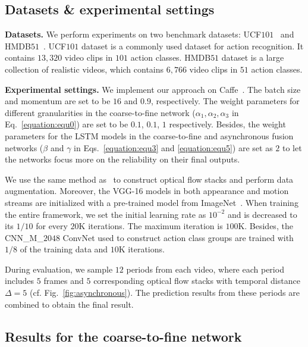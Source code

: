 \documentclass[letterpaper]{article}
\begin{document}
\subsection{Datasets \& experimental settings}\label{Datasets_experimental settings}

{\bf Datasets.} We perform experiments on two benchmark datasets: UCF$101$~\cite{ucf101} and HMDB$51$~\cite{hmdb51}. UCF$101$ dataset is a commonly used dataset for action recognition. It contains $13,320$ video clips in $101$ action classes. HMDB$51$ dataset is a large collection of realistic videos, which contains $6,766$ video clips in $51$ action classes.


{\bf Experimental settings.} We implement our approach on Caffe~\cite{caffe}. The batch size and momentum are set to be $16$ and $0.9$, respectively. The weight parameters for different granularities in the coarse-to-fine network ($\alpha_1,\alpha_2,\alpha_3$ in Eq.~\ref{equation:equ0}) are set to be $0.1$, $0.1$, $1$ respectively. Besides, the weight parameters for the LSTM models in the coarse-to-fine and asynchronous fusion networks ($\beta$ and $\gamma$ in Eqs.~\ref{equation:equ3} and \ref{equation:equ5}) are set as $2$ to let the networks focus more on the reliability on their final outputs.


We use the same method as~\cite{TSN,TDDIDT,transform} to construct optical flow stacks and perform data augmentation. Moreover, the VGG-16 models in both appearance and motion streams are initialized with a pre-trained model from ImageNet~\cite{ImageNet}. When training the entire framework, we set the initial learning rate as $10^{-2}$ and is decreased to its $1/10$ for every $20$K iterations. The maximum iteration is $100$K. Besides, the CNN\_M\_$2048$ ConvNet used to construct action class groups are trained with $1/8$ of the training data and $10$K iterations.

During evaluation, we sample $12$ periods from each video, where each period includes $5$ frames and $5$ corresponding optical flow stacks with temporal distance $\Delta=5$ (cf. Fig.~\ref{fig:asynchronous}). The prediction results from these periods are combined to obtain the final result.






\subsection{Results for the coarse-to-fine network}\label{section:results for coarse to fine}
\end{document}
